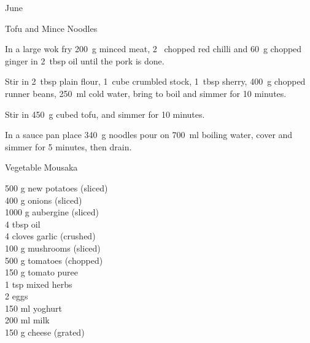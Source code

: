 \begin{menu}{June}
\begin{recipe}{2}{Tofu and Mince Noodles}
    \begin{instructions}
    \item 
        In a large wok fry
        200~g  minced meat,
        2~ chopped red chilli
        and
        60~g chopped ginger
        in
        2~tbsp  oil
        until the pork is done.
      \item 
        Stir in
        2~tbsp  plain flour,
        1~cube crumbled stock,
        1~tbsp  sherry,
        400~g chopped runner beans,
        250~ml  cold water,
        bring to boil
        and
        simmer for 10 minutes.
      \item 
        Stir in
        450~g cubed tofu,
        and
        simmer for 10 minutes.
      \item 
    In a
    sauce pan
    place
    340~g  noodles
    pour on
    700~ml  boiling water,
    cover and simmer for 5 minutes, then drain.
  
    \end{instructions}
    \end{recipe}%
  
    \begin{recipe}{2}{Vegetable Mousaka}%
		\begin{ingredients}
		500 g new potatoes (sliced) \\
	400 g onions (sliced) \\
	1000 g aubergine (sliced) \\
	4 tbsp oil  \\
	4 cloves garlic (crushed) \\
	100 g mushrooms (sliced) \\
	500  g tomatoes (chopped) \\
	150 g tomato puree  \\
	1 tsp mixed herbs  \\
	2  eggs  \\
	150 ml yoghurt  \\
	200 ml milk  \\
	150 g cheese (grated) \\
	
		\end{ingredients}
	
	

\end{recipe}
\end{menu}
